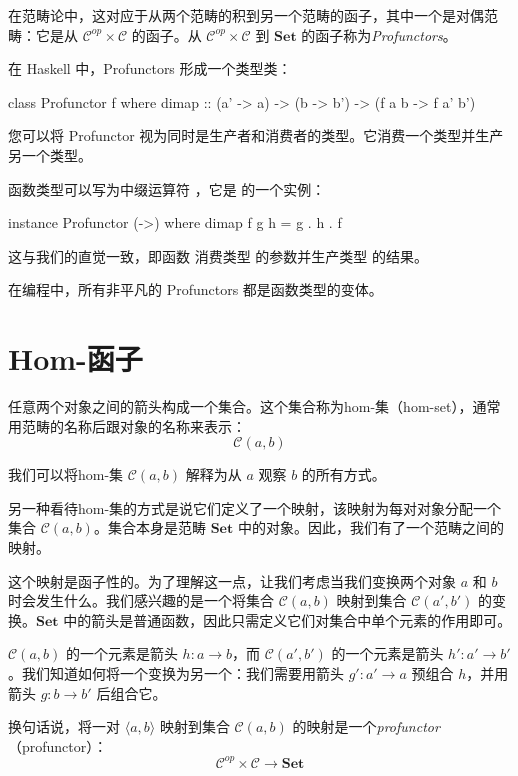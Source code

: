 \documentclass[DaoFP]{subfiles}
\begin{document}
在范畴论中，这对应于从两个范畴的积到另一个范畴的函子，其中一个是对偶范畴：它是从 $\mathcal{C}^{op} \times \mathcal{C}$ 的函子。从 $\mathcal{C}^{op} \times \mathcal{C}$ 到 $\mathbf{Set}$ 的函子称为\emph{Profunctors}。

在 Haskell 中，Profunctors 形成一个类型类：
\begin{haskell}
class Profunctor f where
  dimap :: (a' -> a) -> (b -> b') -> (f a b -> f a' b')
\end{haskell}

您可以将 Profunctor 视为同时是生产者和消费者的类型。它消费一个类型并生产另一个类型。

函数类型可以写为中缀运算符 \hask{(->)}，它是  的一个实例：
\begin{haskell}
instance Profunctor (->) where
  dimap f g h = g . h . f
\end{haskell}
这与我们的直觉一致，即函数  消费类型  的参数并生产类型  的结果。

在编程中，所有非平凡的 Profunctors 都是函数类型的变体。

\section{Hom-函子}

任意两个对象之间的箭头构成一个集合。这个集合称为hom-集（hom-set），通常用范畴的名称后跟对象的名称来表示：
\[ \mathcal{C}(a, b) \]

我们可以将hom-集 $\mathcal{C}(a, b)$ 解释为从 $a$ 观察 $b$ 的所有方式。

另一种看待hom-集的方式是说它们定义了一个映射，该映射为每对对象分配一个集合 $\mathcal{C}(a, b)$。集合本身是范畴 $\mathbf{Set}$ 中的对象。因此，我们有了一个范畴之间的映射。

这个映射是函子性的。为了理解这一点，让我们考虑当我们变换两个对象 $a$ 和 $b$ 时会发生什么。我们感兴趣的是一个将集合 $\mathcal{C}(a, b)$ 映射到集合 $\mathcal{C}(a', b')$ 的变换。$\mathbf{Set}$ 中的箭头是普通函数，因此只需定义它们对集合中单个元素的作用即可。

$\mathcal{C}(a, b)$ 的一个元素是箭头 $h \colon a \to b$，而 $\mathcal{C}(a', b')$ 的一个元素是箭头 $h' \colon a' \to b'$。我们知道如何将一个变换为另一个：我们需要用箭头 $g' \colon a' \to a$ 预组合 $h$，并用箭头 $g \colon b \to b'$ 后组合它。

换句话说，将一对 $\langle a, b \rangle$ 映射到集合 $\mathcal{C}(a, b)$ 的映射是一个\emph{profunctor}（profunctor）：
\[ \mathcal{C}^{op} \times \mathcal{C} \to \mathbf{Set} \]
\end{document}
